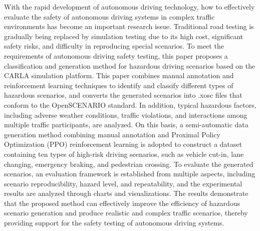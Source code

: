\begin{abstracten}

With the rapid development of autonomous driving technology, how to effectively evaluate the safety of autonomous driving systems in complex traffic environments has become an important research issue. Traditional road testing is gradually being replaced by simulation testing due to its high cost, significant safety risks, and difficulty in reproducing special scenarios. To meet the requirements of autonomous driving safety testing, this paper proposes a classification and generation method for hazardous driving scenarios based on the CARLA simulation platform.
This paper combines manual annotation and reinforcement learning techniques to identify and classify different types of hazardous scenarios, and converts the generated scenarios into .xosc files that conform to the OpenSCENARIO standard. In addition, typical hazardous factors, including adverse weather conditions, traffic violations, and interactions among multiple traffic participants, are analyzed. On this basis, a semi-automatic data generation method combining manual annotation and Proximal Policy Optimization (PPO) reinforcement learning is adopted to construct a dataset containing ten types of high-risk driving scenarios, such as vehicle cut-in, lane changing, emergency braking, and pedestrian crossing.
To evaluate the generated scenarios, an evaluation framework is established from multiple aspects, including scenario reproducibility, hazard level, and repeatability, and the experimental results are analyzed through charts and visualizations. The results demonstrate that the proposed method can effectively improve the efficiency of hazardous scenario generation and produce realistic and complex traffic scenarios, thereby providing support for the safety testing of autonomous driving systems.

\end{abstracten}
